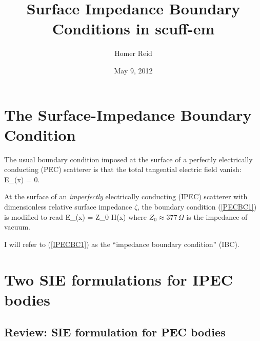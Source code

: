 \documentclass{article}
\title{Surface Impedance Boundary Conditions in {\sc scuff-em}}
\author {Homer Reid}
\date {May 9, 2012}
\begin{document}
\maketitle

\pagestyle{myheadings}

\tableofcontents 

\newpage
\section{The Surface-Impedance Boundary Condition}

The usual boundary condition imposed at the surface of a
perfectly electrically conducting (PEC) scatterer is that
the total tangential electric field vanish:
 { \vb E_{\parallel}(\vb x) = 0. }

At the surface of an \textit{imperfectly} electrically conducting
(IPEC) scatterer with dimensionless relative surface impedance
$\zeta$, the boundary condition (\ref{PECBC1}) is modified to
read 
{
\vb E_{\parallel}(\vb x)
= \zeta Z_0 \times \vb H(\vb x)
}
where $Z_0\approx 377\,\Omega$ is the impedance of vacuum.

I will refer to (\ref{IPECBC1}) as the ``impedance boundary condition'' (IBC).

\newpage
\section{Two SIE formulations for IPEC bodies}

\subsection{Review: SIE formulation for PEC bodies}
\end{document}
